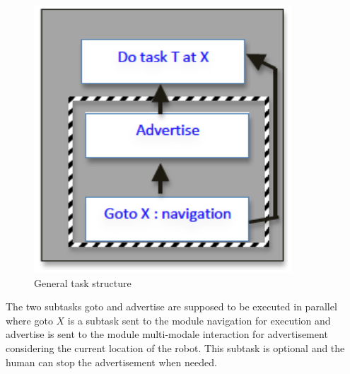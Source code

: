 \documentclass{article}
\begin{document}
\begin{figure}[htbp]
\begin{center}
\includegraphics[height=10cm]{fig/GeneralTask}
\caption{General task structure }
\label{FigTaskstructure}
\end{center}
\end{figure}

The two subtasks goto and advertise are supposed to be executed in parallel where goto $X$ is a subtask sent to the module navigation for execution and advertise is sent to the module multi-modale interaction for advertisement considering the current location of the robot. This subtask is optional and the human can stop the advertisement when needed. 
\end{document}

